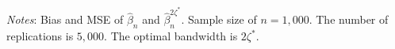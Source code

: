 \documentclass[12pt,fleqn]{article}
\theoremstyle{definition}
\newcommand{\wh}{\widehat}
\newcommand{\hROT}{\zeta^*}
\begin{document}
\begin{sidewaystable}[!htbp]
\begin{adjustbox}{scale=0.99,right}
\begin{threeparttable}
\begin{tablenotes}
\scriptsize
\item \textit{Notes}: Bias and MSE of $\wh{\beta}_{n}$ and $\wh{\beta}_{n}^{2\hROT}$. Sample size of $n=1,000$. The number of replications is $5,000$. The optimal bandwidth is $2\hROT$.
\end{tablenotes}
\end{threeparttable}
\end{adjustbox}
\end{sidewaystable}


% 
\end{document}
